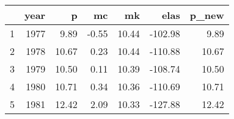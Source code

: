 \begin{tabular}{rrrrrrr}
  \hline
 & year & p & mc & mk & elas & p\_new \\ 
  \hline
1 & 1977 & 9.89 & -0.55 & 10.44 & -102.98 & 9.89 \\ 
  2 & 1978 & 10.67 & 0.23 & 10.44 & -110.88 & 10.67 \\ 
  3 & 1979 & 10.50 & 0.11 & 10.39 & -108.74 & 10.50 \\ 
  4 & 1980 & 10.71 & 0.34 & 10.36 & -110.69 & 10.71 \\ 
  5 & 1981 & 12.42 & 2.09 & 10.33 & -127.88 & 12.42 \\ 
   \hline
\end{tabular}
